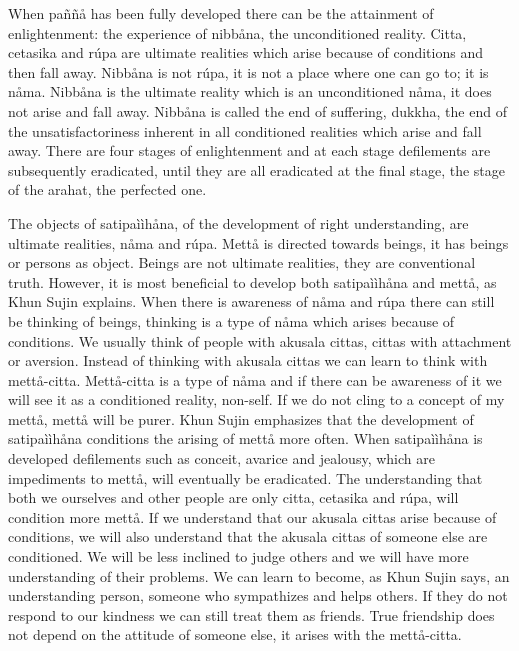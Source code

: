 \documentclass[12pt,twoside]{article}
\begin{document}
When pa\~n\~n{\aa} has been fully developed there can be the attainment
of enlightenment: the experience of nibb{\aa}na, the unconditioned
reality. Citta, cetasika and r\'upa are ultimate realities which arise
because of conditions and then fall away. Nibb{\aa}na is not r\'upa, it
is not a place where one can go to; it is n{\aa}ma. Nibb{\aa}na is the
ultimate reality which is an unconditioned n{\aa}ma, it does not arise
and fall away. Nibb{\aa}na is called the end of suffering, dukkha, the
end of the unsatisfactoriness inherent in all conditioned realities
which arise and fall away. There are four stages of enlightenment and
at each stage defilements are subsequently eradicated, until they are
all eradicated at the final stage, the stage of the arahat, the
perfected one. 

The objects of satipa\`i\`ih{\aa}na, of the development of right
understanding, are ultimate realities, n{\aa}ma and r\'upa. Mett{\aa}
is directed towards beings, it has beings or persons as object. Beings
are not ultimate realities, they are conventional truth. However, it is
most beneficial to develop both satipa\`i\`ih{\aa}na and mett{\aa}, as
Khun Sujin explains. When there is awareness of n{\aa}ma and r\'upa
there can still be thinking of beings, thinking is a type of n{\aa}ma
which arises because of conditions. We usually think of people with
akusala cittas, cittas with attachment or aversion. Instead of thinking
with akusala cittas we can learn to think with mett{\aa}{}-citta.
Mett{\aa}{}-citta is a type of n{\aa}ma and if there can be awareness
of it we will see it as a conditioned reality, non{}-self. If we do not
cling to a concept of {\textasciigrave}{\textasciigrave}my
mett{\aa}{\textquotesingle}{\textquotesingle}, mett{\aa} will be purer.
Khun Sujin emphasizes that the development of satipa\`i\`ih{\aa}na
conditions the arising of mett{\aa} more often. When
satipa\`i\`ih{\aa}na is developed defilements such as conceit, avarice
and jealousy, which are impediments to mett{\aa}, will eventually be
eradicated. The understanding that both we ourselves and other people
are only citta, cetasika and r\'upa, will condition more mett{\aa}. If
we understand that our akusala cittas arise because of conditions, we
will also understand that the akusala cittas of someone else are
conditioned. We will be less inclined to judge others and we will have
more understanding of their problems. We can learn to become, as Khun
Sujin says, {\textasciigrave}{\textasciigrave}an understanding
person{\textquotesingle}{\textquotesingle}, someone who sympathizes and
helps others. If they do not respond to our kindness we can still treat
them as friends. True friendship does not depend on the attitude of
someone else, it arises with the mett{\aa}{}-citta. 
\end{document}
